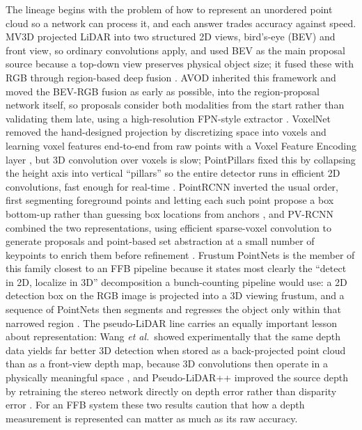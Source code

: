 The lineage begins with the problem of how to represent an unordered point cloud so a network can process it, and each answer trades accuracy against speed. MV3D projected LiDAR into two structured 2D views, bird's-eye (BEV) and front view, so ordinary convolutions apply, and used BEV as the main proposal source because a top-down view preserves physical object size; it fused these with RGB through region-based deep fusion \cite{chen2017mv3d}. AVOD inherited this framework and moved the BEV-RGB fusion as early as possible, into the region-proposal network itself, so proposals consider both modalities from the start rather than validating them late, using a high-resolution FPN-style extractor \cite{ku2018avod}. VoxelNet removed the hand-designed projection by discretizing space into voxels and learning voxel features end-to-end from raw points with a Voxel Feature Encoding layer \cite{zhou2018voxelnet}, but 3D convolution over voxels is slow; PointPillars fixed this by collapsing the height axis into vertical ``pillars'' so the entire detector runs in efficient 2D convolutions, fast enough for real-time \cite{lang2019pointpillars}. PointRCNN inverted the usual order, first segmenting foreground points and letting each such point propose a box bottom-up rather than guessing box locations from anchors \cite{shi2019pointrcnn}, and PV-RCNN combined the two representations, using efficient sparse-voxel convolution to generate proposals and point-based set abstraction at a small number of keypoints to enrich them before refinement \cite{shi2020pvrcnn}. Frustum PointNets is the member of this family closest to an FFB pipeline because it states most clearly the ``detect in 2D, localize in 3D'' decomposition a bunch-counting pipeline would use: a 2D detection box on the RGB image is projected into a 3D viewing frustum, and a sequence of PointNets then segments and regresses the object only within that narrowed region \cite{qi2018frustum}. The pseudo-LiDAR line carries an equally important lesson about representation: Wang \textit{et al.}\ showed experimentally that the same depth data yields far better 3D detection when stored as a back-projected point cloud than as a front-view depth map, because 3D convolutions then operate in a physically meaningful space \cite{wang2019pseudolidar}, and Pseudo-LiDAR++ improved the source depth by retraining the stereo network directly on depth error rather than disparity error \cite{you2020pseudolidarpp}. For an FFB system these two results caution that how a depth measurement is represented can matter as much as its raw accuracy.

